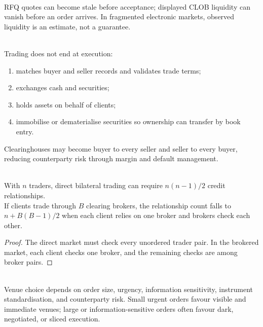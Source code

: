 \documentclass[a4paper,oneside,openany]{book}
\begin{document}
\begin{caveat} \\
RFQ quotes can become stale before acceptance; displayed CLOB liquidity can vanish before an order arrives. In fragmented electronic markets, observed liquidity is an estimate, not a guarantee.
\end{caveat}

\begin{process} \\
Trading does not end at execution:
\begin{enumerate}[label=\roman*.]
\setlength{\itemsep}{0pt}
\item {} matches buyer and seller records and validates trade terms;
\item {} exchanges cash and securities;
\item {} holds assets on behalf of clients;
\item {} immobilise or dematerialise securities so ownership can transfer by book entry.
\end{enumerate}
Clearinghouses may become buyer to every seller and seller to every buyer, reducing counterparty risk through margin and default management.
\end{process}

\begin{proposition} \\
With $n$ traders, direct bilateral trading can require $n(n-1)/2$ credit relationships.\\
If clients trade through $B$ clearing brokers, the relationship count falls to $n+B(B-1)/2$ when each client relies on one broker and brokers check each other.
\begin{proof}
The direct market must check every unordered trader pair. In the brokered market, each client checks one broker, and the remaining checks are among broker pairs.
\end{proof}
\end{proposition}

\begin{practitionernote} \\
Venue choice depends on order size, urgency, information sensitivity, instrument standardisation, and counterparty risk. Small urgent orders favour visible and immediate venues; large or information-sensitive orders often favour dark, negotiated, or sliced execution.
\end{practitionernote}
\end{document}
